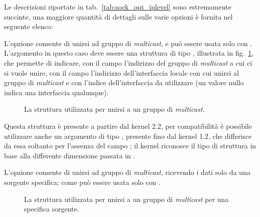 Le descrizioni riportate in tab.~\ref{tab:sock_opt_iplevel} sono estremamente
succinte, una maggiore quantità di dettagli sulle varie opzioni è fornita nel
seguente elenco:
\begin{basedescript}{\desclabelwidth{2.0cm}\desclabelstyle{\nextlinelabel}}
\item[\constd{IP\_ADD\_MEMBERSHIP}] L'opzione consente di unirsi ad gruppo di
  \textit{multicast}, e può essere usata solo con .
  L'argomento  in questo caso deve essere una struttura di tipo
  , illustrata in fig.~\ref{fig:ip_mreqn_struct}, che
  permette di indicare, con il campo  l'indirizzo del
  gruppo di \textit{multicast} a cui ci si vuole unire, con il campo
   l'indirizzo dell'interfaccia locale con cui unirsi al
  gruppo di \textit{multicast} e con  l'indice
  dell'interfaccia da utilizzare (un valore nullo indica una interfaccia
  qualunque).

\begin{figure}[!htb]
  \footnotesize \centering
  \begin{minipage}[c]{0.90\textwidth}
  \end{minipage}
  \caption{La struttura  utilizzata per unirsi a un gruppo di
    \textit{multicast}.}
  \label{fig:ip_mreqn_struct}
\end{figure}

Questa struttura è presente a partire dal kernel 2.2, per compatibilità è
possibile utilizzare anche un argomento di tipo , presente
fino dal kernel 1.2, che differisce da essa soltanto per l'assenza del campo
; il kernel riconosce il tipo di struttura in base alla
differente dimensione passata in . 

\item[\constd{IP\_ADD\_SOURCE\_MEMBERSHIP}] L'opzione consente di unirsi ad
  gruppo di \textit{multicast}, ricevendo i dati solo da una sorgente
  specifica; come  può essere usata solo con
  .

\begin{figure}[!htb]
  \footnotesize \centering
  \begin{minipage}[c]{0.90\textwidth}
  \end{minipage}
  \caption{La struttura  utilizzata per unirsi a un gruppo di
    \textit{multicast} per una specifica sorgente.}
  \label{fig:ip_mreq_source_struct}
\end{figure}


\end{basedescript}
